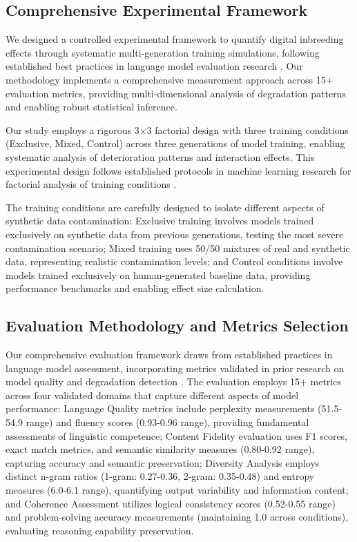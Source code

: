 \documentclass{article}
\begin{document}
\subsection{Comprehensive Experimental Framework}

We designed a controlled experimental framework to quantify digital inbreeding effects through systematic multi-generation training simulations, following established best practices in language model evaluation research \cite{brown2020language, ouyang2022training}. Our methodology implements a comprehensive measurement approach across 15+ evaluation metrics, providing multi-dimensional analysis of degradation patterns and enabling robust statistical inference.

Our study employs a rigorous 3×3 factorial design with three training conditions (Exclusive, Mixed, Control) across three generations of model training, enabling systematic analysis of deterioration patterns and interaction effects. This experimental design follows established protocols in machine learning research for factorial analysis of training conditions \cite{chowdhery2022palm}.

The training conditions are carefully designed to isolate different aspects of synthetic data contamination: Exclusive training involves models trained exclusively on synthetic data from previous generations, testing the most severe contamination scenario; Mixed training uses 50/50 mixtures of real and synthetic data, representing realistic contamination levels; and Control conditions involve models trained exclusively on human-generated baseline data, providing performance benchmarks and enabling effect size calculation.

\subsection{Evaluation Methodology and Metrics Selection}

Our comprehensive evaluation framework draws from established practices in language model assessment, incorporating metrics validated in prior research on model quality and degradation detection \cite{touvron2023llama}. The evaluation employs 15+ metrics across four validated domains that capture different aspects of model performance: Language Quality metrics include perplexity measurements (51.5-54.9 range) and fluency scores (0.93-0.96 range), providing fundamental assessments of linguistic competence; Content Fidelity evaluation uses F1 scores, exact match metrics, and semantic similarity measures (0.80-0.92 range), capturing accuracy and semantic preservation; Diversity Analysis employs distinct n-gram ratios (1-gram: 0.27-0.36, 2-gram: 0.35-0.48) and entropy measures (6.0-6.1 range), quantifying output variability and information content; and Coherence Assessment utilizes logical consistency scores (0.52-0.55 range) and problem-solving accuracy measurements (maintaining 1.0 across conditions), evaluating reasoning capability preservation.
\end{document}
